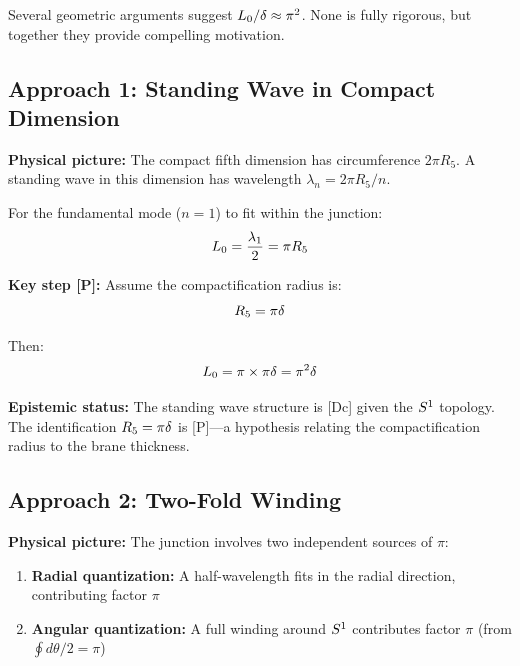 Several geometric arguments suggest $L_0/\delta \approx \pi^2$. None is
fully rigorous, but together they provide compelling motivation.

\subsection{Approach 1: Standing Wave in Compact Dimension}

\textbf{Physical picture:} The compact fifth dimension has circumference $2\pi R_5$.
A standing wave in this dimension has wavelength $\lambda_n = 2\pi R_5 / n$.

\begin{derivationbox}[title=Standing Wave Argument]
    For the fundamental mode ($n = 1$) to fit within the junction:
    \begin{equation}
        L_0 = \frac{\lambda_1}{2} = \pi R_5
    \end{equation}

    \textbf{Key step [P]:} Assume the compactification radius is:
    \begin{equation}
        R_5 = \pi \delta
    \end{equation}

    Then:
    \begin{equation}
        L_0 = \pi \times \pi \delta = \pi^2 \delta
    \end{equation}
    \tagP
\end{derivationbox}

\textbf{Epistemic status:} The standing wave structure is [Dc] given the $S^1$
topology. The identification $R_5 = \pi\delta$ is [P]---a hypothesis relating
the compactification radius to the brane thickness.

\subsection{Approach 2: Two-Fold Winding}

\textbf{Physical picture:} The junction involves two independent sources of $\pi$:
\begin{enumerate}
    \item \textbf{Radial quantization:} A half-wavelength fits in the radial
          direction, contributing factor $\pi$
    \item \textbf{Angular quantization:} A full winding around $S^1$
          contributes factor $\pi$ (from $\oint d\theta / 2 = \pi$)
\end{enumerate}

